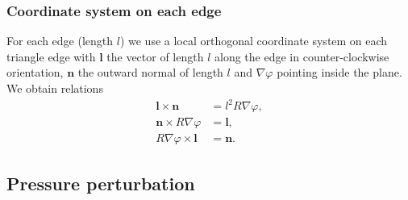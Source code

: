 \documentclass[a4paper, 10pt, english]{article}
\let\temp\vartheta
\let\vartheta\theta
\let\theta\temp
\let\temp\varphi
\let\varphi\phi
\let\phi\temp
\let\vec\symbf
\begin{document}
\subsubsection{Coordinate system on each edge}

For each edge (length $l$) we use a local orthogonal coordinate system on each triangle edge with $\vec{l}$ the vector of length $l$ along the edge in counter-clockwise orientation, $\vec{n}$ the outward normal of length $l$ and $\nabla \phi$ pointing inside the plane. We obtain relations
\begin{align}
  \vec{l} \times \vec{n} &= l^{2} R \nabla \phi, \\
  \vec{n} \times R \nabla \phi &= \vec{l}, \\
  R \nabla \phi \times \vec{l} &= \vec{n}.
\end{align}

\subsection{Pressure perturbation}
\end{document}
